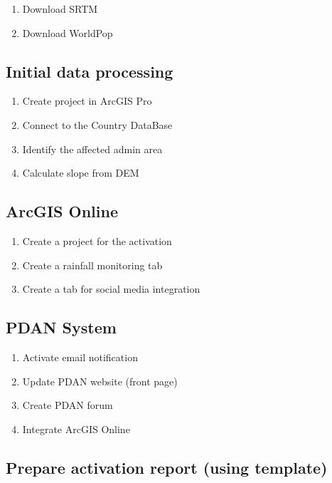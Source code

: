 \documentclass[]{book}
\providecommand{\tightlist}{%
  \setlength{\itemsep}{0pt}\setlength{\parskip}{0pt}}
\theoremstyle{definition}
\theoremstyle{definition}
\theoremstyle{definition}
\theoremstyle{remark}
\begin{document}
\begin{enumerate}
\def\labelenumi{\arabic{enumi}.}
\tightlist
\item
  Download SRTM
\item
  Download WorldPop
\end{enumerate}

\subsection{Initial data processing}\label{initial-data-processing}

\begin{enumerate}
\def\labelenumi{\arabic{enumi}.}
\tightlist
\item
  Create project in ArcGIS Pro
\item
  Connect to the Country DataBase
\item
  Identify the affected admin area
\item
  Calculate slope from DEM
\end{enumerate}

\subsection{ArcGIS Online}\label{arcgis-online}

\begin{enumerate}
\def\labelenumi{\arabic{enumi}.}
\tightlist
\item
  Create a project for the activation
\item
  Create a rainfall monitoring tab
\item
  Create a tab for social media integration
\end{enumerate}

\subsection{PDAN System}\label{pdan-system}

\begin{enumerate}
\def\labelenumi{\arabic{enumi}.}
\tightlist
\item
  Activate email notification
\item
  Update PDAN website (front page)
\item
  Create PDAN forum
\item
  Integrate ArcGIS Online
\end{enumerate}

\subsection{Prepare activation report (using
template)}\label{prepare-activation-report-using-template}
\end{document}
